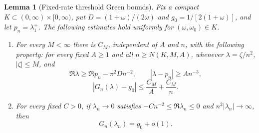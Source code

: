 \documentclass[twoside,10pt]{article}
\numberwithin{equation}{section}
\theoremstyle{slbody}
\newtheorem{lemma}[theorem]{Lemma}
\theoremstyle{definition}
\theoremstyle{remark}
\begin{document}
\begin{lemma}[Fixed-rate threshold Green bounds]
\label{lem:fixed-threshold-green}
Fix a compact $K\subset(0,\infty)\times[0,\infty)$, put
$D=(1+\omega)/(2\omega)$ and $g_0=1/[2(1+\omega)]$, and let
$p_n=\lambda_1^+$.  The following estimates hold uniformly for
$(\omega,\omega_0)\in K$.
\begin{enumerate}
\item For every $M<\infty$ there is $C_M$, independent of $A$ and $n$,
  with the following property: for every fixed $A\ge1$ and all
  $n\ge N(K,M,A)$, whenever $\lambda=\zeta/n^2$, $|\zeta|\le M$, and
  \[
    \Re\lambda\ge\Re p_n-\pi^2D n^{-2},
    \qquad |\lambda-p_n|\ge A n^{-3},
  \]
  \begin{equation}\label{eq:fixed-bounded-threshold-bound}
   |G_n(\lambda)-g_0|\le \frac{C_M}{A}+\frac{C_M}{n}.
  \end{equation}
\item For every fixed $C>0$, if $\lambda_n\to0$ satisfies
  $-C n^{-2}\le\Re\lambda_n\le0$ and
  $n^2|\lambda_n|\to\infty$, then
  \begin{equation}\label{eq:fixed-unbounded-threshold-limit}
    G_n(\lambda_n)=g_0+o(1).
  \end{equation}
\end{enumerate}
\end{lemma}
\end{document}
